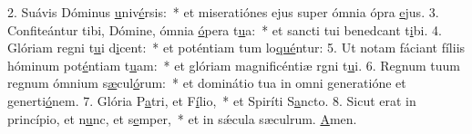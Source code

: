 2. Suávis Dóminus \uline{u}niv\uline{é}rsis:~* et miseratiónes ejus super ómnia ópra \uline{e}jus.
3. Confiteántur tibi, Dómine, ómnia \uline{ó}pera t\uline{u}a:~* et sancti tui benedcant t\uline{i}bi.
4. Glóriam regni t\uline{u}i d\uline{i}cent:~* et poténtiam tum lo\uline{qué}ntur:
5. Ut notam fáciant fíliis hóminum pot\uline{é}ntiam t\uline{u}am:~* et glóriam magnificéntiæ rgni t\uline{u}i.
6. Regnum tuum regnum ómnium s\uline{æ}cul\uline{ó}rum:~* et dominátio tua in omni generatióne et generti\uline{ó}nem.
7. Glória P\uline{a}tri, et F\uline{í}lio,~* et Spiríti S\uline{a}ncto.
8. Sicut erat in princípio, et n\uline{u}nc, et s\uline{e}mper,~* et in sǽcula sæculrum. \uline{A}men.
